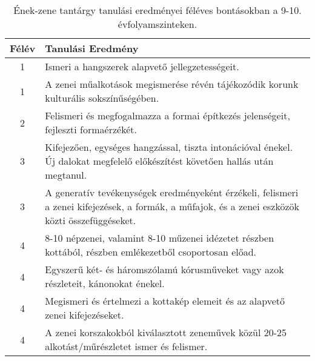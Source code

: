        
           \begin{longtable}{c | p{} }
            \caption[Ének-zene 9-10.]{Ének-zene tantárgy tanulási eredményei féléves bontásokban a 9-10. évfolyamszinteken. }  \\

            \textbf{Félév} & \textbf{Tanulási Eredmény} \\
            \hline
            \endhead
                                
                                          1 &  Ismeri a hangszerek alapvető jellegzetességeit. \\ \hline
                                          1 &  A zenei műalkotások megismerése révén tájékozódik korunk kulturális sokszínűségében. \\ \hline
                                      
                                
                                          2 &  Felismeri és megfogalmazza a formai építkezés jelenségeit, fejleszti formaérzékét. \\ \hline
                                      
                                
                                          3 &  Kifejezően, egységes hangzással, tiszta intonációval énekel. Új dalokat megfelelő előkészítést követően hallás után megtanul. \\ \hline
                                          3 &  A generatív tevékenységek eredményeként érzékeli, felismeri a zenei kifejezések, a formák, a műfajok, és a zenei eszközök közti összefüggéseket. \\ \hline
                                      
                                
                                          4 &  8-10 népzenei, valamint 8-10 műzenei idézetet részben kottából, részben emlékezetből csoportosan előad. \\ \hline
                                          4 &  Egyszerű két- és háromszólamú kórusműveket vagy azok részleteit, kánonokat énekel. \\ \hline
                                          4 &  Megismeri és értelmezi a kottakép elemeit és az alapvető zenei kifejezéseket. \\ \hline
                                          4 &  A zenei korszakokból kiválasztott zeneművek közül 20-25 alkotást/műrészletet ismer és felismer. \\ \hline
                                      
                        \end{longtable}
            \clearpage

